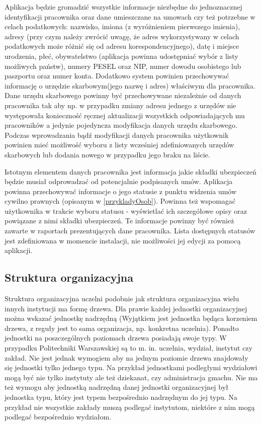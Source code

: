 Aplikacja będzie gromadzić wszystkie informacje niezbędne do jednoznacznej identyfikacji pracownika oraz dane umieszczane na umowach czy też potrzebne w celach podatkowych: nazwisko, imiona (z wyróżnieniem pierwszego imienia), adresy (przy czym należy zwrócić uwagę, że adres wykorzystywany w celach podatkowych może różnić się od adresu korespondencyjnego), datę i miejsce urodzenia, płeć, obywatelstwo (aplikacja powinna udostępniać wybór z listy możliwych państw), numery PESEL oraz NIP, numer dowodu osobistego lub paszportu oraz numer konta. Dodatkowo system powinien przechowywać informację o urzędzie skarbowym(jego nazwę i adres) właściwym dla pracownika. Dane urzędu skarbowego powinny być przechowywane niezależnie od danych pracownika tak aby np. w przypadku zmiany adresu jednego z urzędów nie występowała konieczność ręcznej aktualizacji wszystkich odpowiadających mu pracowników a jedynie pojedyncza modyfikacja danych urzędu skarbowego. Podczas wprowadzania bądź modyfikacji danych pracownika użytkownik powinien mieć możliwość wyboru z listy wcześniej zdefiniowanych urzędów skarbowych lub dodania nowego w przypadku jego braku na liście.

Istotnym elementem danych pracownika jest informacja jakie składki ubezpieczeń będzie musiał odprowadzać od potencjalnie podpisanych umów. Aplikacja powinna przechowywać informacje o jego statusie z punktu widzenia umów cywilno prawnych (opisanym w \ref{przykladyOsob}). Powinna też wspomagać użytkownika w trakcie wyboru statusu - wyświetlać ich szczegółowe opisy oraz powiązane z nimi składki ubezpieczeń. Te informacje powinny być również zawarte w raportach prezentujących dane pracownika. Lista dostępnych statusów jest zdefiniowana w momencie instalacji, nie możliwości jej edycji za pomocą aplikacji.

\subsection[Struktura organizacyjna][Struktura organizacyjna]{Struktura organizacyjna}
Struktura organizacyjna uczelni podobnie jak struktura organizacyjna wielu innych instytucji ma formę drzewa. Dla prawie każdej jednostki organizacyjnej można wskazać jednostkę nadrzędną (Wyjątkiem jest jednostka będąca korzeniem drzewa, z reguły jest to sama organizacja, np. konkretna uczelnia). Ponadto jednostki na poszczególnych poziomach drzewa posiadają swoje typy. W przypadku Politechniki Warszawskiej są to m. in. uczelnia, wydział, instytut czy zakład. Nie jest jednak wymogiem aby na jednym poziomie drzewa znajdowały się jednostki tylko jednego typu. Na przykład jednostkami podległymi wydziałowi mogą być nie tylko instytuty ale też dziekanat, czy administracja gmachu. Nie ma też wymogu aby jednostką nadrzędną danej jednostki organizacyjnej był jednostka typu, który jest typem bezpośrednio nadrzędnym do jej typu. Na przykład nie wszystkie zakłady muszą podlegać instytutom, niektóre z nim mogą podlegać bezpośrednio wydziałom. 

